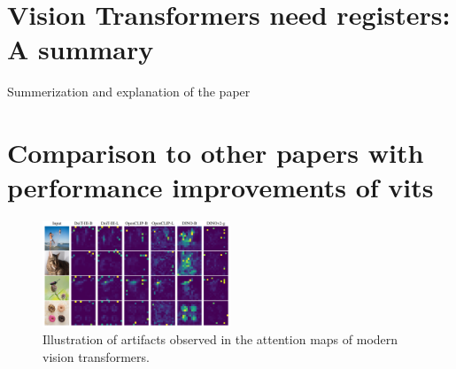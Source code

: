 \documentclass[conference]{IEEEtran}
\begin{document}
\section{Vision Transformers need registers: A summary}
Summerization and explanation of the paper \cite{darcet2024visiontransformersneedregisters} \cite{wang2024mambarvisionmambaneeds}

\section{Comparison to other papers with performance improvements of \ac{vit}s}

\begin{figure}
  \centering
  \includegraphics[width=0.5\textwidth]{figures/vits-artifacts.png}
  \caption{Illustration of artifacts observed in the attention maps of modern vision transformers. \cite{registers}}
  \label{fig:artifacts-observations}
\end{figure}
\end{document}
